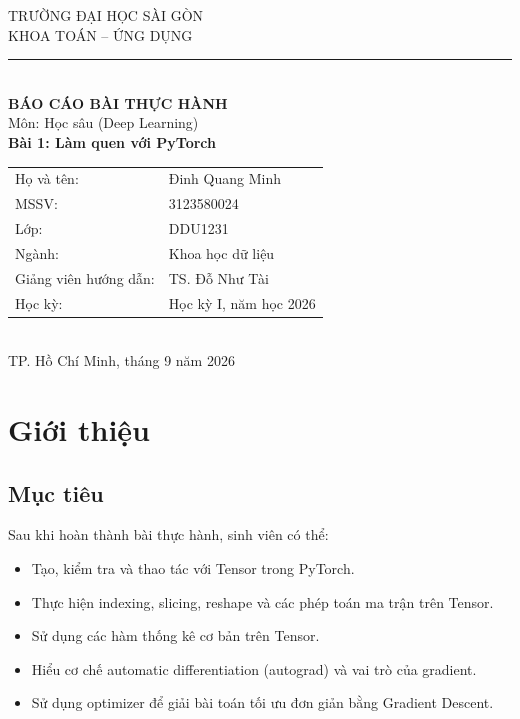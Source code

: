 \documentclass[a4paper,13pt]{article}
\begin{document}
\begin{center}
\large TRƯỜNG ĐẠI HỌC SÀI GÒN \\
\large KHOA TOÁN -- ỨNG DỤNG \\[0.3cm]
\rule{12cm}{1.5pt} \\[0.8cm]

\Large \textbf{BÁO CÁO BÀI THỰC HÀNH} \\[0.4cm]
\large Môn: Học sâu (Deep Learning) \\
\Large \textbf{Bài 1: Làm quen với PyTorch} \\[1.2cm]

\begin{tabular}{ll}
Họ và tên: & Đinh Quang Minh \\
MSSV: & 3123580024 \\
Lớp: & DDU1231 \\
Ngành: & Khoa học dữ liệu \\
Giảng viên hướng dẫn: & TS. Đỗ Như Tài \\
Học kỳ: & Học kỳ I, năm học 2026 \\
\end{tabular}\\[1.5cm]

TP. Hồ Chí Minh, tháng 9 năm 2026 \\
\end{center}

\newpage
\tableofcontents
\newpage

\newpage
\section{Giới thiệu}

\subsection{Mục tiêu}
Sau khi hoàn thành bài thực hành, sinh viên có thể:
\begin{itemize}
  \item Tạo, kiểm tra và thao tác với Tensor trong PyTorch.
  \item Thực hiện indexing, slicing, reshape và các phép toán ma trận trên Tensor.
  \item Sử dụng các hàm thống kê cơ bản trên Tensor.
  \item Hiểu cơ chế automatic differentiation (autograd) và vai trò của gradient.
  \item Sử dụng optimizer để giải bài toán tối ưu đơn giản bằng Gradient Descent.
\end{itemize}
\end{document}
